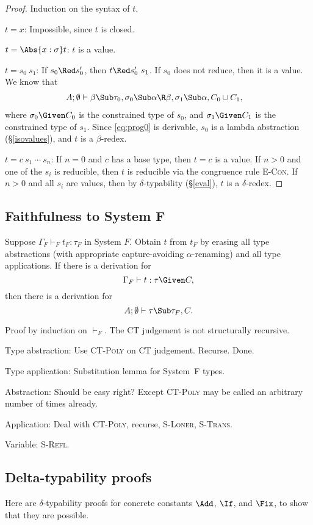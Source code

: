 \documentclass{amsart}
\theoremstyle{definition}
\begin{document}
\begin{proof}
Induction on the syntax of $t$.

\Case$t=x$: Impossible, since $t$ is closed.

\Case$t=\Abs{x:\sigma}t$: $t$ is a value.

\Case$t=s_0~s_1$: If $s_0\Red s_0'$, then $t\Red s_0'~s_1$. If
$s_0$ does not reduce, then it is a value. We know that
\begin{align}
A;\emptyset&\vdash \beta\Sub\tau_0,
\sigma_0\Sub\alpha\R\beta,\sigma_1\Sub\alpha,C_0\cup C_1,
\label{eq:prog0}
\end{align}
where $\sigma_0\Given C_0$ is the constrained type of $s_0$, and
$\sigma_1\Given C_1$ is the constrained type of $s_1$. Since
\eqref{eq:prog0} is derivable, $s_0$ is a lambda abstraction
(\S\ref{isovalues}), and $t$ is a $\beta$-redex.

\Case$t=c~s_1~\cdots~s_n$: If $n=0$ and $c$ has a base type, then
$t=c$ is a value. If $n>0$ and one of the $s_i$ is reducible,
then $t$ is reducible via the congruence rule \textsc{E-Con}. If
$n>0$ and all $s_i$ are values, then by $\delta$-typability
(\S\ref{eval}), $t$ is a $\delta$-redex.
\end{proof}

\subsection{Faithfulness to System F}

Suppose $\Gamma_F\vdash_F t_F:\tau_F$ in System $F$. Obtain $t$
from $t_F$ by erasing all type abstractions (with appropriate
capture-avoiding $\alpha$-renaming) and all type applications.
If there is a derivation for
\[
\Gamma_F\vdash t : \tau\Given C,
\]
then there is a derivation for
\[
A;\emptyset\vdash \tau\Sub\tau_F, C.
\]

Proof by induction on $\vdash_F$. The CT judgement is not
structurally recursive.

Type abstraction: Use \textsc{CT-Poly} on CT judgement. Recurse.
Done.

Type application: Substitution lemma for System~F types.

Abstraction: Should be easy right? Except \textsc{CT-Poly} may be
called an arbitrary number of times already.

Application: Deal with \textsc{CT-Poly}, recurse,
\textsc{S-Loner}, \textsc{S-Trans}.

Variable: \textsc{S-Refl}.

\subsection{Delta-typability proofs}
Here are $\delta$-typability proofs for concrete constants
$\Add$, $\If$, and $\Fix$, to show that they are possible.


\end{document}
